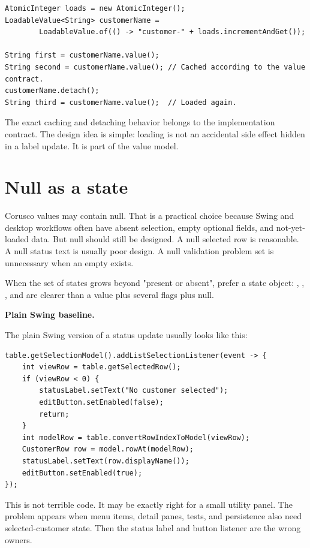 \begin{lstlisting}[caption={A cached scalar value with explicit loading.}]
AtomicInteger loads = new AtomicInteger();
LoadableValue<String> customerName =
        LoadableValue.of(() -> "customer-" + loads.incrementAndGet());

String first = customerName.value();
String second = customerName.value(); // Cached according to the value contract.
customerName.detach();
String third = customerName.value();  // Loaded again.
\end{lstlisting}

The exact caching and detaching behavior belongs to the implementation contract.
The design idea is simple: loading is not an accidental side effect hidden in a
label update. It is part of the value model.

\section{Null as a state}

Corusco values may contain null. That is a practical choice because Swing and
desktop workflows often have absent selection, empty optional fields, and
not-yet-loaded data. But null should still be designed. A null selected row is
reasonable. A null status text is usually poor design. A null validation problem
set is unnecessary when an empty  exists.

When the set of states grows beyond "present or absent", prefer a state object:
, , , and  are clearer than a
value plus several flags plus null.

\textbf{Plain Swing baseline.}

The plain Swing version of a status update usually looks like this:

\begin{lstlisting}[caption={Component-owned status.}]
table.getSelectionModel().addListSelectionListener(event -> {
    int viewRow = table.getSelectedRow();
    if (viewRow < 0) {
        statusLabel.setText("No customer selected");
        editButton.setEnabled(false);
        return;
    }
    int modelRow = table.convertRowIndexToModel(viewRow);
    CustomerRow row = model.rowAt(modelRow);
    statusLabel.setText(row.displayName());
    editButton.setEnabled(true);
});
\end{lstlisting}

This is not terrible code. It may be exactly right for a small utility panel.
The problem appears when menu items, detail panes, tests, and persistence also
need selected-customer state. Then the status label and button listener are the
wrong owners.

